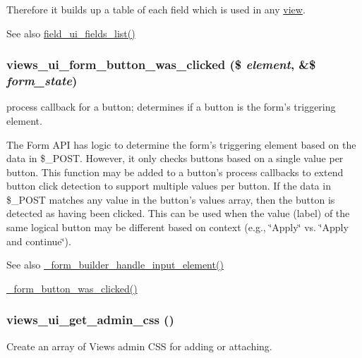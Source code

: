 Therefore it builds up a table of each field which is used in any \hyperlink{classview}{view}.

\begin{DoxySeeAlso}{See also}
\hyperlink{field__ui_8admin_8inc_a5e0e40fc338f93f08e74a304bada0df6}{field\_\-ui\_\-fields\_\-list()} 
\end{DoxySeeAlso}
\hypertarget{admin_8inc_acec4a5aeaa4ce37c0cd093b55c7704fc}{
\subsubsection[{views\_\-ui\_\-form\_\-button\_\-was\_\-clicked}]{\setlength{\rightskip}{0pt plus 5cm}views\_\-ui\_\-form\_\-button\_\-was\_\-clicked (\$ {\em element}, \/  \&\$ {\em form\_\-state})}}
\label{admin_8inc_acec4a5aeaa4ce37c0cd093b55c7704fc}
process callback for a button; determines if a button is the form's triggering element.

The Form API has logic to determine the form's triggering element based on the data in \$\_\-POST. However, it only checks buttons based on a single value per button. This function may be added to a button's process callbacks to extend button click detection to support multiple values per button. If the data in \$\_\-POST matches any value in the button's values array, then the button is detected as having been clicked. This can be used when the value (label) of the same logical button may be different based on context (e.g., \char`\"{}Apply\char`\"{} vs. \char`\"{}Apply and continue\char`\"{}).

\begin{DoxySeeAlso}{See also}
\hyperlink{group__form__api_ga908b7f94c6c9a0ef07a62466c6c196d7}{\_\-form\_\-builder\_\-handle\_\-input\_\-element()} 

\hyperlink{group__form__api_ga3f83a917fae34f718032f4a104bc6b36}{\_\-form\_\-button\_\-was\_\-clicked()} 
\end{DoxySeeAlso}
\hypertarget{admin_8inc_a1aeee5f53a84b56640cb7e41cf288eb3}{
\subsubsection[{views\_\-ui\_\-get\_\-admin\_\-css}]{\setlength{\rightskip}{0pt plus 5cm}views\_\-ui\_\-get\_\-admin\_\-css ()}}
\label{admin_8inc_a1aeee5f53a84b56640cb7e41cf288eb3}
Create an array of Views admin CSS for adding or attaching.

